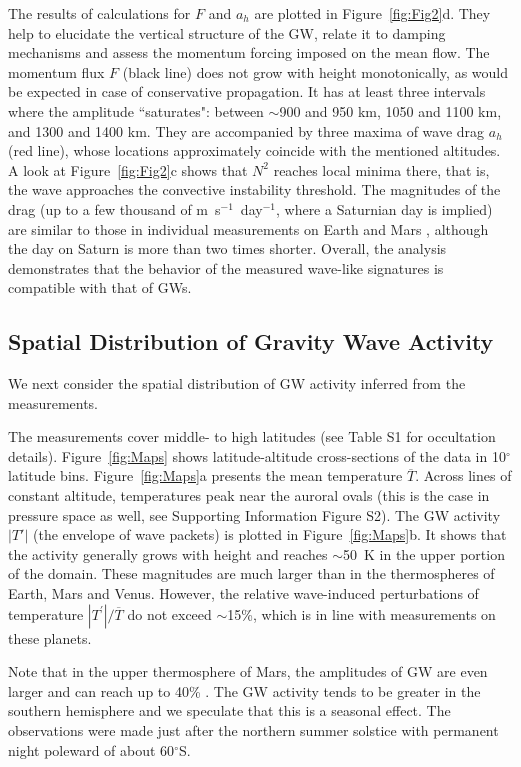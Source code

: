 The results of calculations for $F$ and $a_h$ are plotted in Figure~\ref{fig:Fig2}d. They help to elucidate the vertical structure of the GW, relate it to damping mechanisms and assess the momentum forcing imposed on the mean flow. The momentum flux $F$ (black line) does not grow with height monotonically, as would be expected in case of conservative propagation. It has at least three intervals where the amplitude ``saturates": between $\sim$900 and 950 km, 1050 and 1100 km, and 1300 and 1400 km. They are accompanied by three maxima of wave drag $a_h$ (red line), whose locations approximately coincide with the mentioned altitudes. A look at Figure~\ref{fig:Fig2}c shows that $N^2$ reaches local minima there, that is, the wave approaches the convective instability threshold. The magnitudes of the drag (up to a few thousand of m~s$^{-1}$~day$^{-1}$, where a Saturnian day is implied) are similar to those in individual measurements on Earth \cite{Yigit_Medvedev15} and Mars \cite{Starichenko_etal21}, although the day on Saturn is more than two times shorter. Overall, the analysis demonstrates that the behavior of the measured wave-like signatures is compatible with that of GWs.


\subsection{Spatial Distribution of Gravity Wave Activity}
\label{sec:spatial}

We next consider the spatial distribution of GW activity inferred from the measurements.

The measurements cover middle- to high latitudes (see Table S1 for occultation details).  Figure~\ref{fig:Maps} shows latitude-altitude cross-sections of the data in 10$^\circ$ latitude bins. Figure~\ref{fig:Maps}a presents the mean temperature $\overline{T}$. Across lines of constant altitude, temperatures peak near the auroral ovals (this is the case in pressure space as well, see Supporting Information Figure S2). The GW activity $|T'|$ (the envelope of wave packets) is plotted in Figure~\ref{fig:Maps}b. It shows that the activity generally grows with height and reaches $\sim$50~K in the upper portion of the domain. These magnitudes are much larger than in the thermospheres of Earth, Mars and Venus. However, the relative wave-induced perturbations of temperature $|T^\prime|/\overline{T}$ do not exceed $\sim$15\%, which is in line with measurements on these planets.

Note that in the upper thermosphere of Mars, the amplitudes of GW are even larger and can reach up to 40\% \cite{Yigit_etal21}. The GW activity tends to be greater in the southern hemisphere and we speculate that this is a seasonal effect. The observations were made just after the northern summer solstice with permanent night poleward of about 60$^\circ$S.

